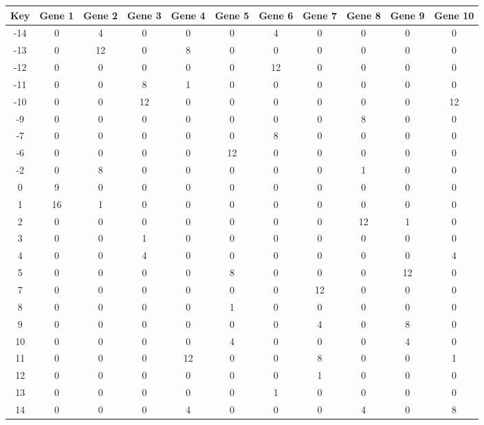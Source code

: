 \begin{tabular}{|c|c|c|c|c|c|c|c|c|c|c|}
\hline
Key & Gene 1 & Gene 2 & Gene 3 & Gene 4 & Gene 5 & Gene 6 & Gene 7 & Gene 8 & Gene 9 & Gene 10 \\
\hline
-14 & 0 & 4 & 0 & 0 & 0 & 4 & 0 & 0 & 0 & 0 \\
-13 & 0 & 12 & 0 & 8 & 0 & 0 & 0 & 0 & 0 & 0 \\
-12 & 0 & 0 & 0 & 0 & 0 & 12 & 0 & 0 & 0 & 0 \\
-11 & 0 & 0 & 8 & 1 & 0 & 0 & 0 & 0 & 0 & 0 \\
-10 & 0 & 0 & 12 & 0 & 0 & 0 & 0 & 0 & 0 & 12 \\
-9 & 0 & 0 & 0 & 0 & 0 & 0 & 0 & 8 & 0 & 0 \\
-7 & 0 & 0 & 0 & 0 & 0 & 8 & 0 & 0 & 0 & 0 \\
-6 & 0 & 0 & 0 & 0 & 12 & 0 & 0 & 0 & 0 & 0 \\
-2 & 0 & 8 & 0 & 0 & 0 & 0 & 0 & 1 & 0 & 0 \\
0 & 9 & 0 & 0 & 0 & 0 & 0 & 0 & 0 & 0 & 0 \\
1 & 16 & 1 & 0 & 0 & 0 & 0 & 0 & 0 & 0 & 0 \\
2 & 0 & 0 & 0 & 0 & 0 & 0 & 0 & 12 & 1 & 0 \\
3 & 0 & 0 & 1 & 0 & 0 & 0 & 0 & 0 & 0 & 0 \\
4 & 0 & 0 & 4 & 0 & 0 & 0 & 0 & 0 & 0 & 4 \\
5 & 0 & 0 & 0 & 0 & 8 & 0 & 0 & 0 & 12 & 0 \\
7 & 0 & 0 & 0 & 0 & 0 & 0 & 12 & 0 & 0 & 0 \\
8 & 0 & 0 & 0 & 0 & 1 & 0 & 0 & 0 & 0 & 0 \\
9 & 0 & 0 & 0 & 0 & 0 & 0 & 4 & 0 & 8 & 0 \\
10 & 0 & 0 & 0 & 0 & 4 & 0 & 0 & 0 & 4 & 0 \\
11 & 0 & 0 & 0 & 12 & 0 & 0 & 8 & 0 & 0 & 1 \\
12 & 0 & 0 & 0 & 0 & 0 & 0 & 1 & 0 & 0 & 0 \\
13 & 0 & 0 & 0 & 0 & 0 & 1 & 0 & 0 & 0 & 0 \\
14 & 0 & 0 & 0 & 4 & 0 & 0 & 0 & 4 & 0 & 8 \\
\hline
\end{tabular}